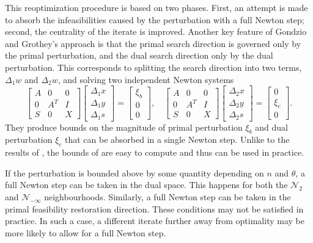 This reoptimization procedure is based on two phases. First, an attempt 
is made to absorb the infeasibilities caused by the perturbation with a full 
Newton step; second, the centrality of the iterate is improved. Another 
key feature of Gondzio and Grothey's approach \cite{GondzioGrothey03}
is that the primal search 
direction is governed only by the primal perturbation,
and the dual search direction only by the dual perturbation.
This corresponds to splitting the search direction into
two terms, $\Delta_1 w$ and $\Delta_2 w$, and solving
two independent Newton systems
%
\[
\left[ \begin{array}{ccc}
    A & 0 & 0 \\ 0 &A^T & I \\ S & 0 & X
  \end{array} \right]
\left[ \begin{array}{c}
    \Delta_1 x \\ \Delta_1 y \\ \Delta_1 s
  \end{array} \right] = 
\left[ \begin{array}{c}
    \xi_b \\ 0 \\ 0
  \end{array} \right],
\quad
\left[ \begin{array}{ccc}
    A & 0 & 0 \\ 0 &A^T & I \\ S & 0 & X
  \end{array} \right]
\left[ \begin{array}{c}
    \Delta_2 x \\ \Delta_2 y \\ \Delta_2 s
  \end{array} \right] = 
\left[ \begin{array}{c}
    0 \\ \xi_c \\ 0
  \end{array} \right].
\]
%
They produce bounds on the magnitude of primal perturbation $\xi_b$ 
and dual perturbation $\xi_c$ that can be absorbed in a single 
Newton step. Unlike to the results of \cite{YildirimWright}, 
the bounds of \cite{GondzioGrothey03} are easy to compute and 
thus can be used in practice.

If the perturbation is bounded above by some quantity depending 
on $n$ and $\theta$, a full Newton step can be taken in the dual space. 
This happens for both the $\mathcal{N}_2$ and $\mathcal{N}_{-\infty}$ 
neighbourhoods. Similarly, a full Newton step can be taken in the 
primal feasibility restoration direction. These conditions may not 
be satisfied in practice. In such a case, a different iterate further 
away from optimality may be more likely to allow for a full Newton step.

